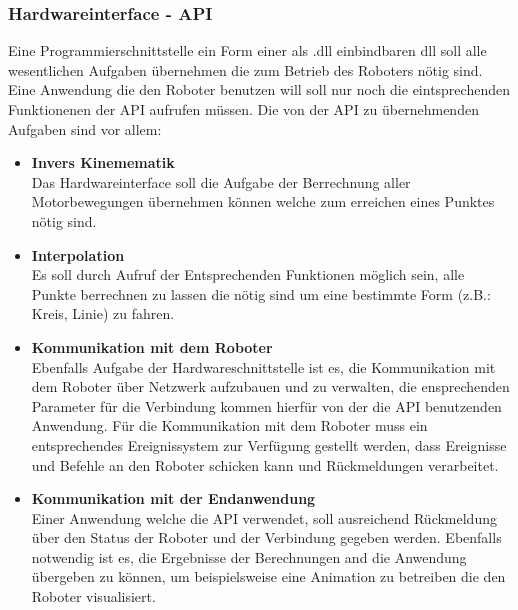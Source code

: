 \subsubsection{Hardwareinterface - API}
Eine Programmierschnittstelle ein Form einer als .dll einbindbaren dll soll alle wesentlichen Aufgaben übernehmen die zum Betrieb des Roboters nötig sind. Eine Anwendung die den Roboter benutzen will soll nur noch die eintsprechenden Funktionenen der API aufrufen müssen. Die von der API zu übernehmenden Aufgaben sind vor allem:
\begin{itemize}
\item \textbf{Invers Kinemematik}\\
Das Hardwareinterface soll die Aufgabe der Berrechnung aller Motorbewegungen übernehmen können welche zum erreichen eines Punktes nötig sind.
\item \textbf{Interpolation}\\
Es soll durch Aufruf der Entsprechenden Funktionen möglich sein, alle Punkte berrechnen zu lassen die nötig sind um eine bestimmte Form (z.B.: Kreis, Linie) zu fahren.
\item \textbf{Kommunikation mit dem Roboter}\\
Ebenfalls Aufgabe der Hardwareschnittstelle ist es, die Kommunikation mit dem Roboter über Netzwerk aufzubauen und zu verwalten, die ensprechenden Parameter für die Verbindung kommen hierfür von der die API benutzenden Anwendung. Für die Kommunikation mit dem Roboter muss ein entsprechendes Ereignissystem zur Verfügung gestellt werden, dass Ereignisse und Befehle an den Roboter schicken kann und Rückmeldungen verarbeitet.
\item \textbf{Kommunikation mit der Endanwendung}\\
Einer Anwendung welche die API verwendet, soll ausreichend Rückmeldung über den Status der Roboter und der Verbindung gegeben werden. Ebenfalls notwendig ist es, die Ergebnisse der Berechnungen and die Anwendung übergeben zu können, um beispielsweise eine Animation zu betreiben die den Roboter visualisiert.
\end{itemize}
